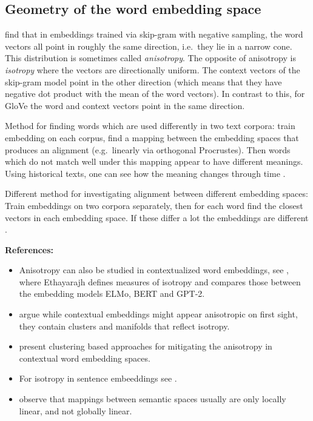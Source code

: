 \documentclass[11pt, a4paper]{amsart}
\begin{document}
\subsection{Geometry of the word embedding space}

\cite{mimno-thompson-2017-strange} find that in embeddings trained via skip-gram with negative sampling, the word vectors all point in roughly the same direction, i.e.\ they lie in a narrow cone.
This distribution is sometimes called \emph{anisotropy}.
The opposite of anisotropy is \emph{isotropy} where the vectors are directionally uniform.
The context vectors of the skip-gram model point in the other direction (which means that they have negative dot product with the mean of the word vectors).
In contrast to this, for GloVe the word and context vectors point in the same direction.

Method for finding words which are used differently in two text corpora:
train embedding on each corpus, find a mapping between the embedding spaces that produces an alignment (e.g.\ linearly via orthogonal Procrustes).
Then words which do not match well under this mapping appear to have different meanings.
Using historical texts, one can see how the meaning changes through time \cite{hamilton-etal-2016-diachronic}.

Different method for investigating alignment between different embedding spaces:
Train embeddings on two corpora separately, then for each word find the closest vectors in each embedding space.
If these differ a lot the embeddings are different \cite{gonen-etal-2020-simple}.

\noindent \textbf{References:}
\begin{itemize}
	\item Anisotropy can also be studied in contextualized word embeddings, see \cite{ethayarajh-2019-contextual}, where Ethayarajh defines measures of isotropy and compares those between the embedding models ELMo, BERT and GPT-2.
	\item \cite{cai2021isotropy} argue while contextual embeddings might appear anisotropic on first sight, they contain clusters and manifolds that reflect isotropy.
	\item \cite{rajaee-pilehvar-2021-cluster} present clustering based approaches for mitigating the anisotropy in contextual word embedding spaces.
	\item For isotropy in sentence embeeddings see \cite{li-etal-2020-sentence}.
	\item \cite{nakashole-flauger-2018-characterizing} observe that mappings between semantic spaces usually are only locally linear, and not globally linear.
\end{itemize}
\end{document}
